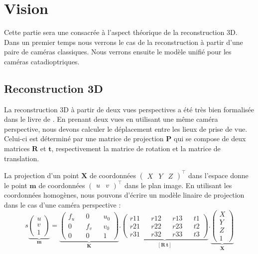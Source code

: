 \section{Vision}
\label{sec:vision}

Cette partie sera une consacrée à l'aspect théorique de la reconstruction 3D.
Dans un premier temps nous verrons le cas de la reconstruction à partir d'une paire de caméras classiques.
Nous verrons ensuite le modèle unifié pour les caméras catadioptriques.

\subsection{Reconstruction 3D}
\label{sub:reconstruction}

La reconstruction 3D à partir de deux vues perspectives a été très bien formalisée dans le livre de \citeauthor{Hartley03Book} \cite{Hartley03Book}.
En prenant deux vues en utilisant une même caméra perspective, nous devons calculer le déplacement entre les lieux de prise de vue.
Celui-ci est déterminé par une matrice de projection $\mathbf{P}$ qui se compose de deux matrices $\mathbf{R}$ et $\mathbf{t}$, respectivement la matrice de rotation et la matrice de translation.

La projection d'un point $\mathbf{X}$ de coordonnées $\begin{pmatrix}X&Y&Z\end{pmatrix}^\top$ dans l'espace donne le point $\mathbf{m}$ de coordonnées $\begin{pmatrix}u&v\end{pmatrix}^\top$ dans le plan image.
En utilisant les coordonnées homogènes, nous pouvons d'écrire un modèle linaire de projection dans le cas d'une caméra perspective :
\begin{equation}
s \underbrace{\begin{pmatrix}u \\ v \\ 1\end{pmatrix}}_{\mathbf{m}} = 
\underbrace{\begin{pmatrix}f_u && 0 && u_0 \\ 0 && f_v && v_0 \\ 0 && 0 && 1\end{pmatrix}}_{\mathbf{K}} . 
\underbrace{\begin{pmatrix}r11 && r12 && r13 && t1 \\ r21 && r22 && r23 && t2 \\ r31 && r32 && r33 && t3\end{pmatrix}}_{[\mathbf{R~t}]} . 
\underbrace{\begin{pmatrix}X \\ Y \\ Z \\ 1\end{pmatrix}}_{\mathbf{X}}
\label{eq:projection}
\end{equation}

